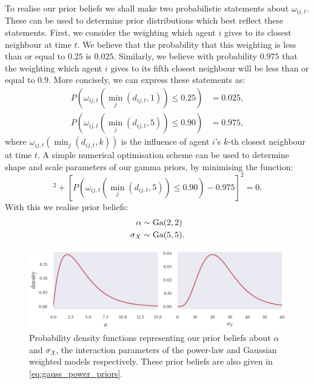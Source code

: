 To realise our prior beliefs we shall make two probabilistic statements about
$\omega_{ij,t}$. These can be used to determine prior distributions which best reflect
these statements. First, we consider the weighting which agent $i$ gives to its closest
neighbour at time $t$. We believe that the probability that this weighting is less than or
equal to $0.25$ is $0.025$. Similarly, we believe with probability $0.975$ that the
weighting which agent $i$ gives to its fifth closest neighbour will be less than or equal
to $0.9$.  More concisely, we can express these statements as:
\begin{align*}
    P(\omega_{ij, t}({\min_j(d_{ij,t}, 1)}) \leq 0.25) &= 0.025, \\
    P(\omega_{ij, t}({\min_j(d_{ij,t}, 5)}) \leq 0.90) &= 0.975,
\end{align*}
where $\omega_{ij, t}({\min_j(d_{ij,t}, k)})$ is the influence of agent $i$'s $k$-th
closest neighbour at time $t$. A simple numerical optimisation scheme can be used to
determine shape and scale parameters of our gamma priors, by minimising the function:
\begin{equation*}
    [P(\omega_{ij, t}({\min_j(d_{ij,t}, 1)}) \leq 0.25) - 0.025]^2
    + [P(\omega_{ij, t}({\min_j(d_{ij,t}, 5)}) \leq 0.90) - 0.975]^2 = 0.
\end{equation*}
With this we realise prior beliefs:
\begin{align}
    \label{eq:gauss_power_priors}
    \begin{split}
        \alpha   & \sim \textrm{Ga}(2, 2) \\
        \sigma_X & \sim \textrm{Ga}(5, 5).
    \end{split}
\end{align}

\begin{figure}[tb]
    \includegraphics{gauss_power_priors.pdf}
    \caption{Probability density functions representing our prior beliefs about $\alpha$
    and $\sigma_X$, the interaction parameters of the power-law and Gaussian weighted
    models respectively. These prior beliefs are also given in
    \cref{eq:gauss_power_priors}.}
\end{figure}

